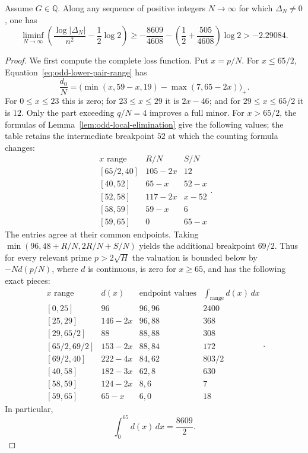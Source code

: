 \begin{proposition}\label{prop:finite-lower}
Assume $G\in\mathbb Q$.  Along any sequence of positive integers
$N\to\infty$ for which $\Delta_N\ne0$, one has
\begin{equation}\label{eq:finite-lower-final}
 \liminf_{N\to\infty}
 \left(\frac{\log|\Delta_N|}{n^2}-\frac12\log2\right)
 \ge -\frac{8609}{4608}
       -\left(\frac12+\frac{505}{4608}\right)\log2
 >-2.29084.
\end{equation}
\end{proposition}

\begin{proof}
We first compute the complete loss function.  Put $x=p/N$.  For
$x\le65/2$, Equation~\eqref{eq:odd-lower-pair-range} has
\[
 \frac{d_0}{N}
  =\bigl(\min(x,59-x,19)-\max(7,65-2x)\bigr)_+.
\]
For $0\le x\le23$ this is zero; for $23\le x\le29$ it is
$2x-46$; and for $29\le x\le65/2$ it is $12$.  Only the part
exceeding $q/N=4$ improves a full minor.  For $x>65/2$, the formulas
of Lemma~\ref{lem:odd-local-elimination} give the following values;
the table retains the intermediate breakpoint $52$ at which the
counting formula changes:
\[
\begin{array}{c|cc}
 x\text{ range}&R/N&S/N\\\hline
 {[65/2,40]}&105-2x&12\\
 {[40,52]}&65-x&52-x\\
 {[52,58]}&117-2x&x-52\\
 {[58,59]}&59-x&6\\
 {[59,65]}&0&65-x
\end{array}.
\]
The entries agree at their common endpoints.  Taking
$\min(96,48+R/N,2R/N+S/N)$ yields the additional breakpoint $69/2$.
Thus for every relevant prime $p>2\sqrt H$ the valuation is bounded
below by $-Nd(p/N)$, where $d$ is continuous, is zero for $x\ge65$,
and has the following exact pieces:
\begin{equation}\label{eq:odd-loss-table}
\begin{array}{c|c|c|c}
 x\text{ range}&d(x)&
       \text{endpoint values}&\displaystyle\int_{\text{range}}d(x)\,dx\\\hline
 {[0,25]}&96&96,96&2400\\
 {[25,29]}&146-2x&96,88&368\\
 {[29,65/2]}&88&88,88&308\\
 {[65/2,69/2]}&153-2x&88,84&172\\
 {[69/2,40]}&222-4x&84,62&803/2\\
 {[40,58]}&182-3x&62,8&630\\
 {[58,59]}&124-2x&8,6&7\\
 {[59,65]}&65-x&6,0&18
\end{array}.
\end{equation}
In particular,
\begin{equation}\label{eq:odd-loss-area}
 \int_0^{65}d(x)\,dx=\frac{8609}{2}.
\end{equation}


\end{proof}
